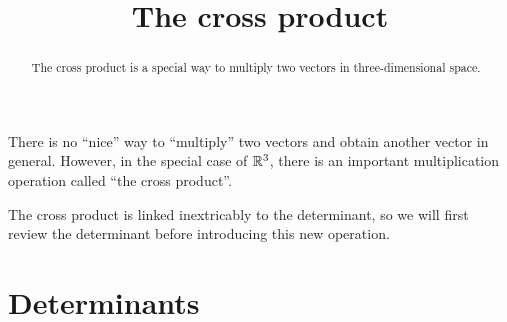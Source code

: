 \documentclass{ximera}
\title[Dig-In:]{The cross product}
\begin{document}
\begin{abstract}
  The cross product is a special way to multiply two vectors in
  three-dimensional space.
\end{abstract}
\maketitle

There is no ``nice'' way to ``multiply'' two vectors and obtain
another vector in general. However, in the special case of $\mathbb R^3$,
there is an important multiplication operation called ``the cross
product''.

The cross product is linked inextricably to the determinant, so we
will first review the determinant before introducing this new
operation.

\section{Determinants}
\end{document}

